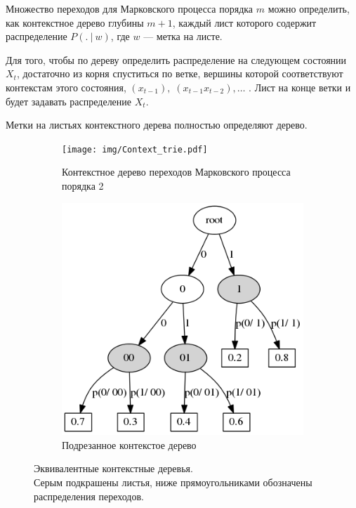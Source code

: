 \documentclass{matmex-diploma-custom}
\begin{document}
Множество переходов для Марковского процесса порядка $ m $ можно определить, как контекстное дерево глубины $ m+1 $, каждый лист которого содержит распределение $P(.~|~w)$, где $ w $ --- метка на листе.

Для того, чтобы по дереву определить распределение на следующем состоянии $ X_{t} $, достаточно из корня спуститься по ветке, вершины которой соответствуют контекстам этого состояния, $(x_{t-1}),\; (x_{t-1}x_{t-2}), \ldots$ . Лист на конце ветки и будет задавать распределение $ X_{t} $.

\begin{remark}
Метки на листьях контекстного дерева полностью определяют дерево.
\end{remark}

\begin{figure}[h!]\centering
\begin{subfigure}[b]{0.49 \textwidth}
	\texttt{[image: img/Context\_trie.pdf]}
	\centering
	\caption{ Контекстное дерево переходов Марковского процесса порядка 2 }
	\label{fig:context_trie}
\end{subfigure}
\hfil \hfil
\begin{subfigure}[b]{0.49 \textwidth}
	\includegraphics[scale=0.38]{img/Prune_c_trie.png}
	\centering
	\caption{ Подрезанное контекстое дерево}
	\label{fig:prune_c_trie}
\end{subfigure}
\caption{Эквивалентные контекстные деревья. \\Серым подкрашены листья, ниже прямоугольниками обозначены распределения переходов.}
\label{fig:sample_tries}
\end{figure}
\end{document}
